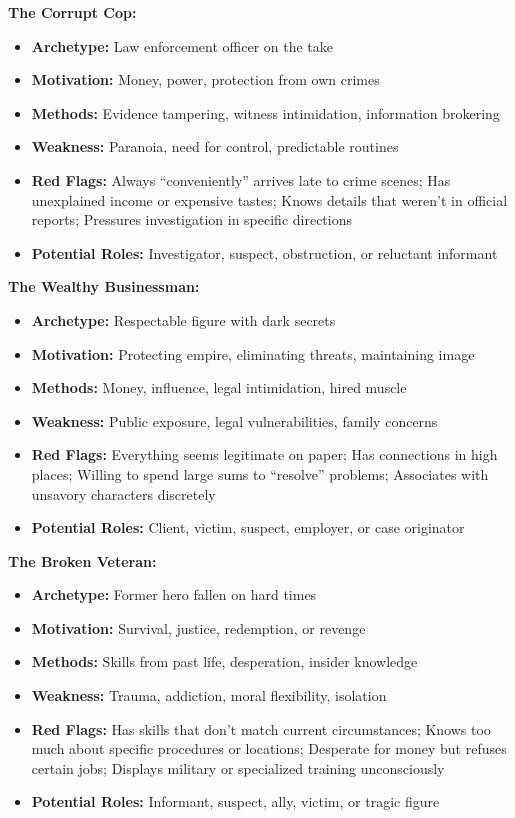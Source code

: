 \documentclass[11pt]{article}
\begin{document}
\textbf{The Corrupt Cop:}
\begin{itemize}
    \item \textbf{Archetype:} Law enforcement officer on the take
    \item \textbf{Motivation:} Money, power, protection from own crimes
    \item \textbf{Methods:} Evidence tampering, witness intimidation, information brokering
    \item \textbf{Weakness:} Paranoia, need for control, predictable routines
    \item \textbf{Red Flags:} Always ``conveniently'' arrives late to crime scenes; Has unexplained income or expensive tastes; Knows details that weren't in official reports; Pressures investigation in specific directions
    \item \textbf{Potential Roles:} Investigator, suspect, obstruction, or reluctant informant
\end{itemize}

\textbf{The Wealthy Businessman:}
\begin{itemize}
    \item \textbf{Archetype:} Respectable figure with dark secrets
    \item \textbf{Motivation:} Protecting empire, eliminating threats, maintaining image
    \item \textbf{Methods:} Money, influence, legal intimidation, hired muscle
    \item \textbf{Weakness:} Public exposure, legal vulnerabilities, family concerns
    \item \textbf{Red Flags:} Everything seems legitimate on paper; Has connections in high places; Willing to spend large sums to ``resolve'' problems; Associates with unsavory characters discretely
    \item \textbf{Potential Roles:} Client, victim, suspect, employer, or case originator
\end{itemize}

\textbf{The Broken Veteran:}
\begin{itemize}
    \item \textbf{Archetype:} Former hero fallen on hard times
    \item \textbf{Motivation:} Survival, justice, redemption, or revenge
    \item \textbf{Methods:} Skills from past life, desperation, insider knowledge
    \item \textbf{Weakness:} Trauma, addiction, moral flexibility, isolation
    \item \textbf{Red Flags:} Has skills that don't match current circumstances; Knows too much about specific procedures or locations; Desperate for money but refuses certain jobs; Displays military or specialized training unconsciously
    \item \textbf{Potential Roles:} Informant, suspect, ally, victim, or tragic figure
\end{itemize}
\end{document}

